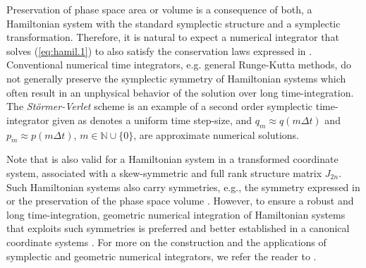Preservation of phase space area or volume is a consequence of both, a Hamiltonian system with the standard symplectic structure and a symplectic transformation. Therefore, it is natural to expect a numerical integrator that solves (\ref{eq:hamil.1}) to also satisfy the conservation laws expressed in  . Conventional numerical time integrators, e.g. general Runge-Kutta methods, do not generally preserve the symplectic symmetry of Hamiltonian systems which often result in an unphysical behavior of the solution over long time-integration. The \emph{St\"ormer-Verlet} scheme is an example of a second order symplectic time-integrator given as
 denotes a uniform time step-size, and $q_m \approx q(m\Delta t)$ and $p_m \approx p(m\Delta t)$, $m \in \mathbb{N} \cup \{ 0\}$, are approximate numerical solutions.

Note that  is also valid for a Hamiltonian system in a transformed coordinate system, associated with a skew-symmetric and full rank structure matrix $J_{2n}$. Such Hamiltonian systems also carry symmetries, e.g., the symmetry expressed in  or the preservation of the phase space volume \cite{Hairer:1250576}. However, to ensure a robust and long time-integration, geometric numerical integration of Hamiltonian systems that exploits such symmetries is preferred and better established in a canonical coordinate systems \cite{Hairer:1250576,bhatt2017structure}.  For more on the construction and the applications of symplectic and geometric numerical integrators, we refer the reader to \cite{Hairer:1250576,bhatt2017structure}.
